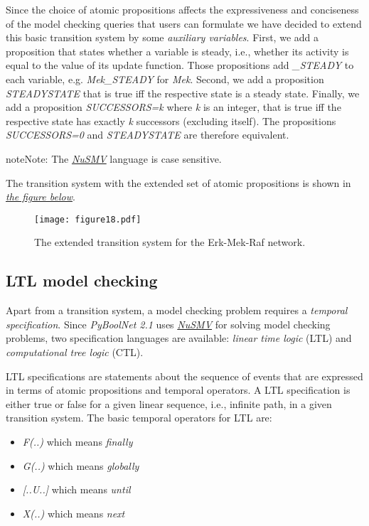 \documentclass[letterpaper,10pt,english]{sphinxmanual}
\begin{document}
Since the choice of atomic propositions affects the expressiveness and conciseness of the model checking queries that users can formulate
we have decided to extend this basic transition system by some \emph{auxiliary variables}.
First, we add a proposition that states whether a variable is steady, i.e., whether its activity is equal to the value of its update function.
Those propositions add \emph{\_STEADY} to each variable, e.g. \emph{Mek\_STEADY} for \emph{Mek}.
Second, we add a proposition \emph{STEADYSTATE} that is true iff the respective state is a steady state.
Finally, we add a proposition \emph{SUCCESSORS=k} where \emph{k} is an integer,
that is true iff the respective state has exactly \emph{k} successors (excluding itself).
The propositions \emph{SUCCESSORS=0} and \emph{STEADYSTATE} are therefore equivalent.

\begin{notice}{note}{Note:}
The {\hyperref[Installation:installation-nusmv]{\emph{NuSMV}}} language is case sensitive.
\end{notice}

The transition system with the extended set of atomic propositions is shown in {\hyperref[Manual:figure18]{\emph{the figure below}}}.
\begin{figure}[htbp]
\centering
\capstart

\texttt{[image: figure18.pdf]}
\caption{The extended transition system for the Erk-Mek-Raf network.}\label{Manual:figure18}\end{figure}


\subsection{LTL model checking}
\label{Manual:ltl-model-checking}
Apart from a transition system, a model checking problem requires a \emph{temporal specification}.
Since \emph{PyBoolNet 2.1} uses {\hyperref[Installation:installation-nusmv]{\emph{NuSMV}}} for solving model checking problems, two specification languages are available:
\emph{linear time logic} (LTL) and \emph{computational tree logic} (CTL).

LTL specifications are statements about the sequence of events that are expressed in terms of atomic propositions and temporal operators.
A LTL specification is either true or false for a given linear sequence, i.e., infinite path, in a given transition system.
The basic temporal operators for LTL are:
\begin{itemize}
\item {} 
\emph{F(..)} which means \emph{finally}

\item {} 
\emph{G(..)} which means \emph{globally}

\item {} 
\emph{{[}..U..{]}} which means \emph{until}

\item {} 
\emph{X(..)} which means \emph{next}

\end{itemize}
\end{document}
